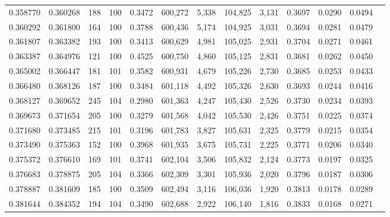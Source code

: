 \begin{tabular}{rrrrrrrrrrrrr}
0.358770 & 0.360268 &   188 & 100 &                                     0.3472 & 600,272 &   5,338 & 104,825 &   3,131 & 0.3697 & 0.0290 & 0.0494 \\
0.360292 & 0.361800 &   164 & 100 &                                     0.3788 & 600,436 &   5,174 & 104,925 &   3,031 & 0.3694 & 0.0281 & 0.0479 \\
0.361807 & 0.363382 &   193 & 100 &                                     0.3413 & 600,629 &   4,981 & 105,025 &   2,931 & 0.3704 & 0.0271 & 0.0461 \\
0.363387 & 0.364976 &   121 & 100 &                                     0.4525 & 600,750 &   4,860 & 105,125 &   2,831 & 0.3681 & 0.0262 & 0.0450 \\
0.365002 & 0.366447 &   181 & 101 &                                     0.3582 & 600,931 &   4,679 & 105,226 &   2,730 & 0.3685 & 0.0253 & 0.0433 \\
0.366480 & 0.368126 &   187 & 100 &                                     0.3484 & 601,118 &   4,492 & 105,326 &   2,630 & 0.3693 & 0.0244 & 0.0416 \\
0.368127 & 0.369652 &   245 & 104 &                                     0.2980 & 601,363 &   4,247 & 105,430 &   2,526 & 0.3730 & 0.0234 & 0.0393 \\
0.369673 & 0.371654 &   205 & 100 &                                     0.3279 & 601,568 &   4,042 & 105,530 &   2,426 & 0.3751 & 0.0225 & 0.0374 \\
0.371680 & 0.373485 &   215 & 101 &                                     0.3196 & 601,783 &   3,827 & 105,631 &   2,325 & 0.3779 & 0.0215 & 0.0354 \\
0.373490 & 0.375363 &   152 & 100 &                                     0.3968 & 601,935 &   3,675 & 105,731 &   2,225 & 0.3771 & 0.0206 & 0.0340 \\
0.375372 & 0.376610 &   169 & 101 &                                     0.3741 & 602,104 &   3,506 & 105,832 &   2,124 & 0.3773 & 0.0197 & 0.0325 \\
0.376683 & 0.378875 &   205 & 104 &                                     0.3366 & 602,309 &   3,301 & 105,936 &   2,020 & 0.3796 & 0.0187 & 0.0306 \\
0.378887 & 0.381609 &   185 & 100 &                                     0.3509 & 602,494 &   3,116 & 106,036 &   1,920 & 0.3813 & 0.0178 & 0.0289 \\
0.381644 & 0.384352 &   194 & 104 &                                     0.3490 & 602,688 &   2,922 & 106,140 &   1,816 & 0.3833 & 0.0168 & 0.0271 \\

\end{tabular}
